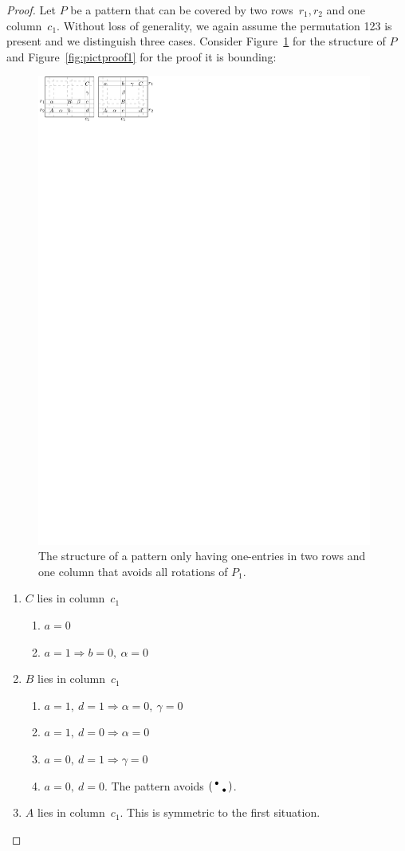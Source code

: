 \begin{proof}
Let $P$ be a pattern that can be covered by two rows~$r_1,r_2$ and one column~$c_1$. Without loss of generality, we again assume the permutation 123 is present and we distinguish three cases. Consider Figure~\ref{fig:twoplusone} for the structure of $P$ and Figure~\ref{fig:pictproof1} for the proof it is bounding:
\begin{figure}[!ht]
	\centering
	\includegraphics[width=110mm]{img/twoplusone.pdf}
	\caption{The structure of a pattern only having one-entries in two rows and one column that avoids all rotations of $P_1$.}
	\label{fig:twoplusone}
\end{figure}
\begin{enumerate}
\item $C$ lies in column~$c_1$
	\begin{enumerate}
		\item $a=0$
		\item $a=1\Rightarrow b=0,\ \alpha=0$
	\end{enumerate}
\item $B$ lies in column~$c_1$
	\begin{enumerate}
		\item $a=1,\ d=1\Rightarrow\alpha=0,\ \gamma=0$
		\item $a=1,\ d=0\Rightarrow\alpha=0$
		\item $a=0,\ d=1\Rightarrow\gamma=0$
		\item $a=0,\ d=0$. The pattern avoids $\left(\begin{smallmatrix}\bullet& \\ &\bullet\end{smallmatrix}\right)$.
	\end{enumerate}
\item $A$ lies in column~$c_1$. This is symmetric to the first situation.
\end{enumerate}


\end{proof}
